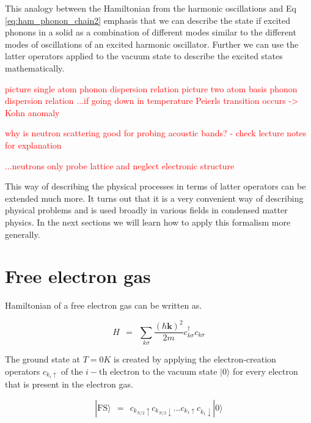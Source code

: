 \documentclass[10pt]{report}
\numberwithin{equation}{chapter}
\newcommand{\refEq}[1]{
  Eq  \ref{#1}
}
\newcommand{\vc}[1]{ %
  \mathbf{#1}
}
\begin{document}
This analogy between the Hamiltonian from the harmonic oscillations and \refEq{eq:ham_phonon_chain2} emphasis that we can describe the state if excited phonons in a solid as a combination of different modes similar to the different modes of oscillations of an excited harmonic oscillator. Further we can use the latter operators applied to the vacuum state to describe the excited states mathematically.

\textcolor{red}{picture single atom phonon dispersion relation}
\textcolor{red}{picture two atom basis phonon dispersion relation}
\textcolor{red}{...if going down in temperature Peierls transition occurs -> Kohn anomaly}

\textcolor{red}{why is neutron scattering good for probing acoustic bands? - check lecture notes for explanation}

\textcolor{red}{...neutrons only probe lattice and neglect electronic structure}


This way of describing the physical processes in terms of latter operators can be extended much more. 
It turns out that it is a very convenient way of describing physical problems and is used broadly in various fields in condensed matter physics. In the next sections we will learn how to apply this formalism more generally. 



%

\section{Free electron gas} %

Hamiltonian of a free electron gas can be written as. 

\begin{equation}
  H ~~=~~ \sum_{k \sigma} \frac{(\hbar \vc{k})^2}{2m} c_{k \sigma}^\dag c_{k \sigma}
\end{equation}


The ground state at $T=0K$ is created by applying the electron-creation operators $c_{k_i \uparrow}$ of the $i-\text{th}$ electron to the vacuum state $|0\rangle$ for every electron that is present in the electron gas. 

\begin{equation}
  | \text{FS} \rangle ~~=~~ c_{k_{N/2} \uparrow} c_{k_{N/2} \downarrow} ... c_{k_1 \uparrow} c_{k_1 \downarrow} | 0 \rangle 
\end{equation}
\end{document}

